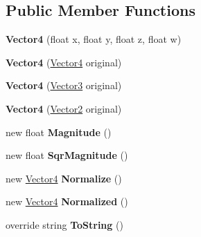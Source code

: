 \subsection*{Public Member Functions}
\begin{DoxyCompactItemize}
\item 
\mbox{\label{class_pillar3_d_1_1_vector4_afcc54cf1d28b1e7535147dd255224b8e}} 
{\bfseries Vector4} (float x, float y, float z, float w)
\item 
\mbox{\label{class_pillar3_d_1_1_vector4_a7acc452f978c93668f6334c3bda5b68a}} 
{\bfseries Vector4} (\hyperlink{class_pillar3_d_1_1_vector4}{Vector4} original)
\item 
\mbox{\label{class_pillar3_d_1_1_vector4_a138582725390583137522f13463cd782}} 
{\bfseries Vector4} (\hyperlink{class_pillar3_d_1_1_vector3}{Vector3} original)
\item 
\mbox{\label{class_pillar3_d_1_1_vector4_a0c408a4d670de0aaa4f76ecc39ac0412}} 
{\bfseries Vector4} (\hyperlink{class_pillar3_d_1_1_vector2}{Vector2} original)
\item 
\mbox{\label{class_pillar3_d_1_1_vector4_a3cbe4c38a1c560c706ae5a4639e7ffd8}} 
new float {\bfseries Magnitude} ()
\item 
\mbox{\label{class_pillar3_d_1_1_vector4_a964a402e31f2f797b7506c993f0c9c92}} 
new float {\bfseries Sqr\+Magnitude} ()
\item 
\mbox{\label{class_pillar3_d_1_1_vector4_a0f22c7eb9ab01e943c47d2f474ad6a09}} 
new \hyperlink{class_pillar3_d_1_1_vector4}{Vector4} {\bfseries Normalize} ()
\item 
\mbox{\label{class_pillar3_d_1_1_vector4_a8bf784854a980006bf21fc40bccacc08}} 
new \hyperlink{class_pillar3_d_1_1_vector4}{Vector4} {\bfseries Normalized} ()
\item 
\mbox{\label{class_pillar3_d_1_1_vector4_a11b8735a211e3dd543620940e817b9ac}} 
override string {\bfseries To\+String} ()
\end{DoxyCompactItemize}
